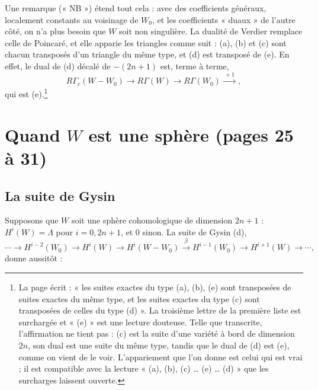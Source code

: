 \documentclass[11pt,a4paper]{article}
\begin{document}
Une remarque (« NB ») étend tout cela : avec des coefficients généraux,
localement constants au voisinage de $W_0$, et les coefficients « duaux » de
l'autre côté, on n'a plus besoin que $W$ soit non singulière. La dualité de
Verdier remplace celle de Poincaré, et elle apparie les triangles comme suit :
(a), (b) et (c) sont chacun transposés d'un triangle du même type, et (d) est
transposé de (e). En effet, le dual de (d) décalé de $-(2n+1)$ est, terme à
terme,
\[
  R\Gamma_{c}(W - W_0) \longrightarrow R\Gamma(W) \longrightarrow R\Gamma(W_0)
  \xrightarrow{\ +1\ },
\]
qui est (e).\footnote{La page écrit : « les suites exactes du type (a), (b),
(e) sont transposées de suites exactes du même type, et les suites exactes du
type (c) sont transposées de celles du type (d) ». La troisième lettre de la
première liste est surchargée et « (e) » est une lecture douteuse. Telle que
transcrite, l'affirmation ne tient pas : (c) est la suite d'une variété à bord
de dimension $2n$, son dual est une suite du même type, tandis que le dual de
(d) est (e), comme on vient de le voir. L'appariement que l'on donne est celui
qui est vrai ; il est compatible avec la lecture « (a), (b), (c) … (e) … (d) »
que les surcharges laissent ouverte.}

\section*{Quand $W$ est une sphère (pages 25 à 31)}

\subsection*{La suite de Gysin}

Supposons que $W$ soit une sphère cohomologique de dimension $2n+1$ :
$H^{i}(W) = \Lambda$ pour $i = 0, 2n+1$, et $0$ sinon. La suite de Gysin (d),
\[
  \cdots \to H^{i-2}(W_0) \to H^{i}(W) \to H^{i}(W - W_0)
  \xrightarrow{\ \beta\ } H^{i-1}(W_0) \to H^{i+1}(W) \to \cdots,
\]
donne aussitôt :
\end{document}
